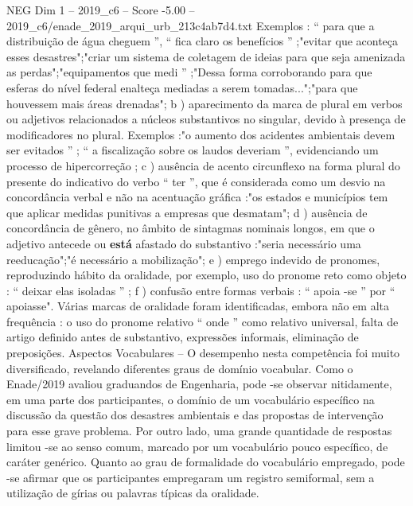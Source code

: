 \begin{textsample}{NEG Dim 1 – 2019\_c6 – Score -5.00 – 2019\_c6/enade\_2019\_arqui\_urb\_213c4ab7d4.txt}
Exemplos : “ para que a distribuição de água cheguem ”, “ fica claro os benefícios ” ;"evitar que aconteça esses desastres";"criar um sistema de coletagem de ideias para que seja amenizada as perdas";"equipamentos que medi ” ;"Dessa forma corroborando para que esferas do nível federal enalteça mediadas a serem tomadas...";"para que houvessem mais áreas drenadas"; b ) aparecimento da marca de plural em verbos ou adjetivos relacionados a núcleos substantivos no singular, devido à presença de modificadores no plural.
Exemplos :"o aumento dos acidentes ambientais devem ser evitados ” ; “ a fiscalização sobre os laudos deveriam ”, evidenciando um processo de hipercorreção ; c ) ausência de acento circunflexo na forma plural do presente do indicativo do verbo “ ter ”, que é considerada como um desvio na concordância verbal e não na acentuação gráfica :"os estados e municípios tem que aplicar medidas punitivas a empresas que desmatam"; d ) ausência de concordância de gênero, no âmbito de sintagmas nominais longos, em que o adjetivo antecede ou \textbf{está} afastado do substantivo :"seria necessário uma reeducação";"é necessário a mobilização"; e ) emprego indevido de pronomes, reproduzindo hábito da oralidade, por exemplo, uso do pronome reto como objeto : “ deixar elas isoladas ” ; f ) confusão entre formas verbais : “ apoia -se ” por “ apoiasse".
Várias marcas de oralidade foram identificadas, embora não em alta frequência : o uso do pronome relativo “ onde ” como relativo universal, falta de artigo definido antes de substantivo, expressões informais, eliminação de preposições.
Aspectos Vocabulares – O desempenho nesta competência foi muito diversificado, revelando diferentes graus de domínio vocabular.
Como o Enade/2019 avaliou graduandos de Engenharia, pode -se observar nitidamente, em uma parte dos participantes, o domínio de um vocabulário específico na discussão da questão dos desastres ambientais e das propostas de intervenção para esse grave problema.
Por outro lado, uma grande quantidade de respostas limitou -se ao senso comum, marcado por um vocabulário pouco específico, de caráter genérico.
Quanto ao grau de formalidade do vocabulário empregado, pode -se afirmar que os participantes empregaram um registro semiformal, sem a utilização de gírias ou palavras típicas da oralidade.

\end{textsample}
